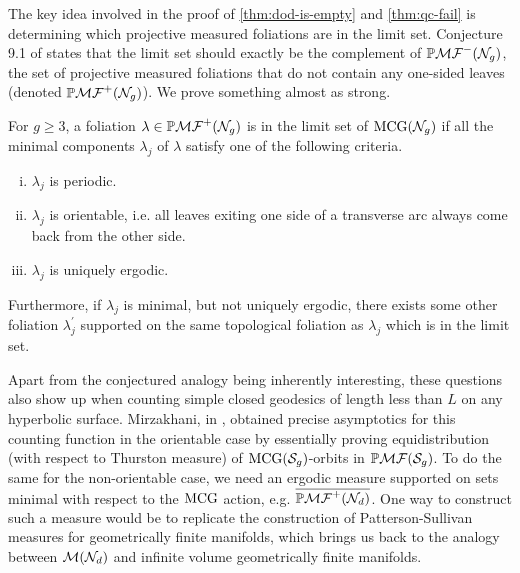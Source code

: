 \documentclass[12pt, reqno]{amsart}
\begin{document}
The key idea involved in the proof of \autoref{thm:dod-is-empty} and \autoref{thm:qc-fail} is determining which projective measured foliations are in the limit set.
Conjecture 9.1 of \cite{gendulphe_whats_2017} states that the limit set should exactly be the complement of $\mathbb{P}\mathcal{MF}^-(\mathcal{N}_g)$, the set of projective measured foliations that do not contain any one-sided leaves (denoted $\mathbb{P}\mathcal{MF}^+(\mathcal{N}_g)$).
We prove something almost as strong.
\begingroup
\def\thetheorem{\ref{thm:rational-approximation}}
\begin{theorem}
  For $g \geq 3$, a foliation $\lambda \in \mathbb{P}\mathcal{MF}^+(\mathcal{N}_g)$ is in the limit set of $\mathrm{MCG}(\mathcal{N}_g)$ if all the minimal components $\lambda_j$ of $\lambda$ satisfy one of the following criteria.
  \begin{enumerate}[(i)]
  \item $\lambda_j$ is periodic.
  \item $\lambda_j$ is orientable, i.e. all leaves exiting one side of a transverse arc always come back from the other side.
  \item $\lambda_j$ is uniquely ergodic.
  \end{enumerate}
  Furthermore, if $\lambda_j$ is minimal, but not uniquely ergodic, there exists some other foliation $\lambda_j^{\prime}$ supported on the same topological foliation as $\lambda_j$ which is in the limit set.
\end{theorem}
\addtocounter{theorem}{-1}
\endgroup

Apart from the conjectured analogy being inherently interesting, these questions also show up when counting simple closed geodesics of length less than $L$ on any hyperbolic surface. Mirzakhani, in \autocite{mirzakhani2008growth}, obtained precise asymptotics for this counting function in the orientable case by essentially proving equidistribution (with respect to Thurston measure) of $\mathrm{MCG}(\mathcal{S}_{g})$-orbits in $\mathbb{P}\mathcal{MF}(\mathcal{S}_g)$.
To do the same for the non-orientable case, we need an ergodic measure supported on sets
minimal with respect to the $\mathrm{MCG}$ action, e.g. $\overline{\mathbb{P}\mathcal{MF}^+(\mathcal{N}_d)}$.
One way to construct such a measure would be to replicate the construction of Patterson-Sullivan measures for geometrically finite manifolds, which brings us back
to the analogy between $\mathcal{M}(\mathcal{N}_d)$ and infinite volume geometrically finite manifolds.

\end{document}
